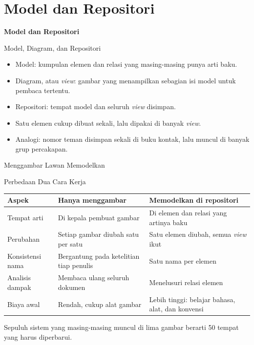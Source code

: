 \documentclass[aspectratio=169, table, 12pt]{beamer}
\begin{document}
\section{Model dan Repositori}

\begin{frame}{\hfill}
  \centering
  \Huge{\textbf{Model dan Repositori}}
\end{frame}

\begin{frame}{{\Large Model, Diagram, dan Repositori}}
  \vspace{10pt}
  \begin{itemize}
    \item Model: kumpulan elemen dan relasi yang masing-masing punya arti baku.
    \item Diagram, atau \textit{view}: gambar yang menampilkan sebagian isi model untuk pembaca tertentu.
    \item Repositori: tempat model dan seluruh \textit{view} disimpan.
    \item Satu elemen cukup dibuat sekali, lalu dipakai di banyak \textit{view}.
    \item Analogi: nomor teman disimpan sekali di buku kontak, lalu muncul di banyak grup percakapan.
  \end{itemize}
\end{frame}

\begin{frame}{{\Large Menggambar Lawan Memodelkan}}
  \centering
\end{frame}

\begin{frame}{{\Large Perbedaan Dua Cara Kerja}}
  \footnotesize
  \begin{tabularx}{\textwidth}{lXX}
    \hline
    \textbf{Aspek} & \textbf{Hanya menggambar} & \textbf{Memodelkan di repositori} \\
    \hline
    Tempat arti & Di kepala pembuat gambar & Di elemen dan relasi yang artinya baku \\
    \hline
    Perubahan & Setiap gambar diubah satu per satu & Satu elemen diubah, semua \textit{view} ikut \\
    \hline
    Konsistensi nama & Bergantung pada ketelitian tiap penulis & Satu nama per elemen \\
    \hline
    Analisis dampak & Membaca ulang seluruh dokumen & Menelusuri relasi elemen \\
    \hline
    Biaya awal & Rendah, cukup alat gambar & Lebih tinggi: belajar bahasa, alat, dan konvensi \\
    \hline
  \end{tabularx}

  \vspace{8pt}
  \small Sepuluh sistem yang masing-masing muncul di lima gambar berarti 50 tempat yang harus diperbarui.
\end{frame}
\end{document}
